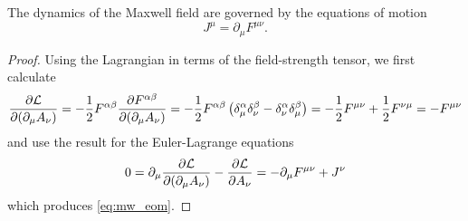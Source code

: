 \begin{lemma}
	The dynamics of the Maxwell field are governed by the equations of motion
	\begin{equation}
		J^\mu
		=
		\partial_\mu
		F^{\mu\nu}
		\label{eq:mw_eom}
		.
	\end{equation}
\end{lemma}
\begin{proof}
	Using the Lagrangian in terms of the field-strength tensor, we first calculate
	\begin{equation*}
		\pdv{\mathcal{L}}{(\partial_\mu A_\nu)}
		=
		-
		\frac{1}{2}
		F^{\alpha\beta}
		\pdv{F^{\alpha\beta}}{(\partial_\mu A_\nu)}
		=
		-
		\frac{1}{2}
		F^{\alpha\beta}
		\left(
			\delta^\alpha_\mu
			\delta^\beta_\nu
			-
			\delta^\alpha_\nu
			\delta^\beta_\mu
		\right)
		=
		-
		\frac{1}{2}
		F^{\mu\nu}
		+
		\frac{1}{2}
		F^{\nu\mu}
		=
		-
		F^{\mu\nu}
	\end{equation*}
	and use the result for the Euler-Lagrange equations
	\begin{equation*}
		0
		=
		\partial_\mu
		\pdv{\mathcal{L}}{(\partial_\mu A_\nu)}
		-
		\pdv{\mathcal{L}}{A_\nu}
		=
		-
		\partial_\mu
		F^{\mu\nu}
		+
		J^\nu
	\end{equation*}
	which produces \cref{eq:mw_eom}.
\end{proof}

